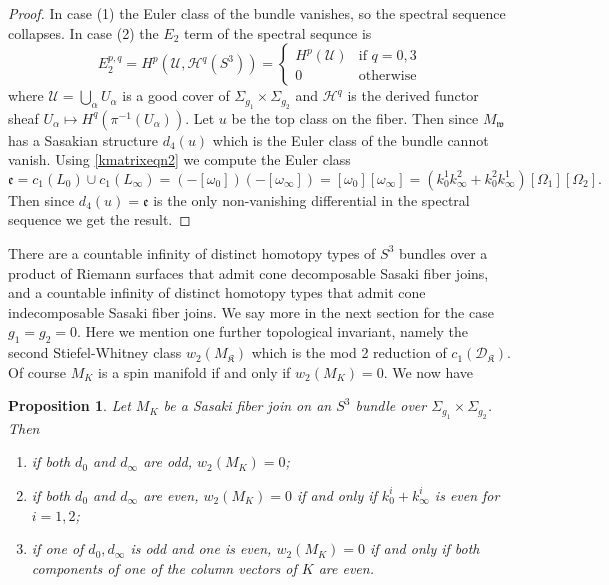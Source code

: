 \documentclass[12pt]{amsart}
\newtheorem{proposition}[theorem]{Proposition}
\def\bbc{{\mathbb C}}
\def\bbp{{\mathbb P}}
\def\gra{\alpha}
\def\gro{\omega}
\def\grO{\Omega}
\def\grS{\Sigma}
\def\calu{{\mathcal U}}
\def\cald{{\mathcal D}}
\def\calh{{\mathcal H}}
\def\calu{{\mathcal U}}
\def\ge{{\mathfrak e}}
\def\gw{{\mathfrak w}}
\def\gK{{\mathfrak K}}
\begin{document}
\begin{proof}
In case (1) the Euler class of the bundle vanishes, so the spectral sequence collapses. In case (2) the $E_2$ term of the spectral sequnce is
$$E_2^{p,q}=H^p(\calu,\calh^q(S^3))=\begin{cases} H^p(\calu) & \text{if $q=0,3$} \\
                                                                                         0 &\text{otherwise}
                                                                                         \end{cases}  $$
where $\calu=\bigcup_\gra U_\gra$ is a good cover of $\grS_{g_1}\times\grS_{g_2}$ and $\calh^q$ is the derived functor sheaf $U_\gra\mapsto H^q(\pi^{-1}(U_\gra))$. Let $u$ be the top class on the fiber. Then since $M_\gw$ has a Sasakian structure $d_4(u)$ which is the Euler class of the bundle cannot vanish. Using \eqref{kmatrixeqn2} we compute the Euler class
$$\ge=c_1(L_0)\cup c_1(L_\infty)=(-[\gro_0])(-[\gro_\infty])=[\gro_0][\gro_\infty]=(k^1_0k^2_\infty+k^2_0k^1_\infty)[\grO_1][\grO_2].$$
Then since $d_4(u)=\ge$ is the only non-vanishing differential in the spectral sequence we get the result.





\end{proof}

There are a countable infinity of distinct homotopy types of $S^3$ bundles over a product of Riemann surfaces that admit cone decomposable Sasaki fiber joins, and a countable infinity of distinct homotopy types that admit cone indecomposable Sasaki fiber joins. We say more in the next section for the case $g_1=g_2=0$. Here we mention one further topological invariant, namely the  second Stiefel-Whitney class $w_2(M_\gK)$ which is the mod 2 reduction of $c_1(\cald_\gK)$. Of course $M_K$ is a spin manifold if and only if $w_2(M_K)=0$. We now have
\begin{proposition}\label{spinman}
Let $M_K$ be a Sasaki fiber join on an $S^{3}$ bundle over $\grS_{g_1}\times \grS_{g_2}$. Then 
\begin{enumerate}
\item if both $d_0$ and $d_\infty$ are odd, $w_2(M_K)=0$;
\item if both $d_0$ and $d_\infty$ are even, $w_2(M_K)=0$ if and only if $k^i_0+k^i_\infty$ is even for $i=1,2$;
\item if one of $d_0,d_\infty$ is odd and one is even, $w_2(M_K)=0$ if and only if both components of one of the column vectors of $K$ are even.
\end{enumerate}
\end{proposition}
\end{document}
